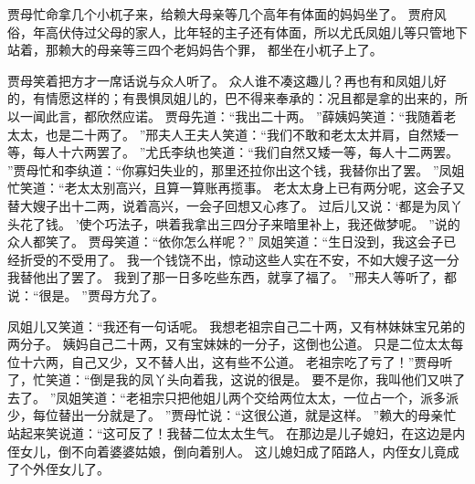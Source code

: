 贾母忙命拿几个小杌子来，给赖大母亲等几个高年有体面的妈妈坐了。
贾府风俗，年高伏侍过父母的家人，比年轻的主子还有体面，所以尤氏凤姐儿等只管地下站着，那赖大的母亲等三四个老妈妈告个罪，
都坐在小杌子上了。
\par
贾母笑着把方才一席话说与众人听了。
众人谁不凑这趣儿？再也有和凤姐儿好的，有情愿这样的；有畏惧凤姐儿的，巴不得来奉承的：况且都是拿的出来的，所以一闻此言，都欣然应诺。
贾母先道：“我出二十两。
”薛姨妈笑道：“我随着老太太，也是二十两了。
”邢夫人王夫人笑道：“我们不敢和老太太并肩，自然矮一等，每人十六两罢了。
”尤氏李纨也笑道：“我们自然又矮一等，每人十二两罢。
”贾母忙和李纨道：“你寡妇失业的，那里还拉你出这个钱，我替你出了罢。
”凤姐忙笑道：“老太太别高兴，且算一算账再揽事。
老太太身上已有两分呢，这会子又替大嫂子出十二两，说着高兴，一会子回想又心疼了。
过后儿又说：‘都是为凤丫头花了钱。
’使个巧法子，哄着我拿出三四分子来暗里补上，我还做梦呢。
”说的众人都笑了。
贾母笑道：“依你怎么样呢？”
凤姐笑道：“生日没到，我这会子已经折受的不受用了。
我一个钱饶不出，惊动这些人实在不安，不如大嫂子这一分我替他出了罢了。
我到了那一日多吃些东西，就享了福了。
”邢夫人等听了，都说：“很是。
”贾母方允了。
\par
凤姐儿又笑道：“我还有一句话呢。
我想老祖宗自己二十两，又有林妹妹宝兄弟的两分子。
姨妈自己二十两，又有宝妹妹的一分子，这倒也公道。
只是二位太太每位十六两，自己又少，又不替人出，这有些不公道。
老祖宗吃了亏了！”贾母听了，忙笑道：“倒是我的凤丫头向着我，这说的很是。
要不是你，我叫他们又哄了去了。
”凤姐笑道：“老祖宗只把他姐儿两个交给两位太太，一位占一个，派多派少，每位替出一分就是了。
”贾母忙说：“这很公道，就是这样。
”赖大的母亲忙站起来笑说道：“这可反了！我替二位太太生气。
在那边是儿子媳妇，在这边是内侄女儿，倒不向着婆婆姑娘，倒向着别人。
这儿媳妇成了陌路人，内侄女儿竟成了个外侄女儿了。
